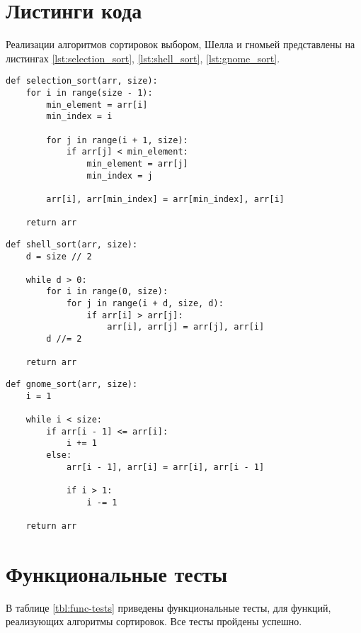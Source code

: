 \section{Листинги кода}

Реализации алгоритмов сортировок выбором, Шелла и гномьей представлены на листингах \ref{lst:selection_sort}, \ref{lst:shell_sort}, \ref{lst:gnome_sort}.

\begin{lstlisting}[label=lst:selection_sort,caption=Алгоритм сортировки выбором]
def selection_sort(arr, size):
    for i in range(size - 1):
        min_element = arr[i]
        min_index = i

        for j in range(i + 1, size):
            if arr[j] < min_element:
                min_element = arr[j]
                min_index = j
        
        arr[i], arr[min_index] = arr[min_index], arr[i]

	return arr
\end{lstlisting} 

\begin{lstlisting}[label=lst:shell_sort,caption=Алгоритм сортировки Шелла]
def shell_sort(arr, size):
    d = size // 2

    while d > 0:
        for i in range(0, size):
            for j in range(i + d, size, d):
                if arr[i] > arr[j]:
                    arr[i], arr[j] = arr[j], arr[i]
        d //= 2

	return arr
\end{lstlisting}

\begin{lstlisting}[label=lst:gnome_sort,caption=Алгоритм гномьей сортировки]
def gnome_sort(arr, size):
    i = 1

    while i < size:
        if arr[i - 1] <= arr[i]:
            i += 1
        else:
            arr[i - 1], arr[i] = arr[i], arr[i - 1]

            if i > 1:
                i -= 1

	return arr
\end{lstlisting} 

\section{Функциональные тесты}

В таблице \ref{tbl:func-tests} приведены функциональные тесты, для функций, реализующих алгоритмы сортировок. Все тесты пройдены успешно.

